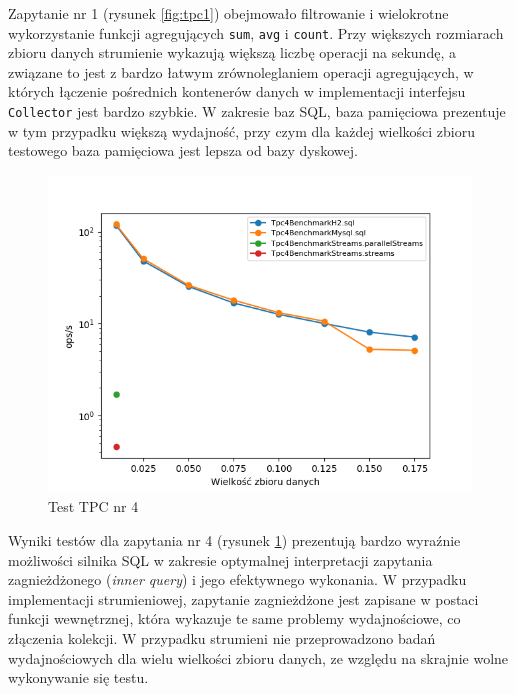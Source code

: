 \documentclass[12pt,twoside,openright]{extarticle}
\begin{document}
    Zapytanie nr 1 (rysunek \ref{fig:tpc1}) obejmowało filtrowanie i wielokrotne wykorzystanie funkcji agregujących \texttt{sum}, \texttt{avg} i \texttt{count}. Przy większych rozmiarach zbioru danych strumienie wykazują większą liczbę operacji na sekundę, a związane to jest z bardzo łatwym zrównoleglaniem operacji agregujących, w których łączenie pośrednich kontenerów danych w implementacji interfejsu \texttt{Collector} jest bardzo szybkie. W zakresie baz SQL, baza pamięciowa prezentuje w tym przypadku większą wydajność, przy czym dla każdej wielkości zbioru testowego baza pamięciowa jest lepsza od bazy dyskowej. 

\newpage
\begin{figure}[H]
\centering
\includegraphics[width=15cm]{plots/Tpc4Benchmark}
\caption{Test TPC nr 4}
    \label{fig:tpc4}
\end{figure}

    Wyniki testów dla zapytania nr 4 (rysunek \ref{fig:tpc4}) prezentują bardzo wyraźnie możliwości silnika SQL w zakresie optymalnej interpretacji zapytania zagnieżdżonego (\textit{inner query}) i jego efektywnego wykonania. W przypadku implementacji strumieniowej, zapytanie zagnieżdżone jest zapisane w postaci funkcji wewnętrznej, która wykazuje te same problemy wydajnościowe, co złączenia kolekcji. W przypadku strumieni nie przeprowadzono badań wydajnościowych dla wielu wielkości zbioru danych, ze względu na skrajnie wolne wykonywanie się testu.
\end{document}
